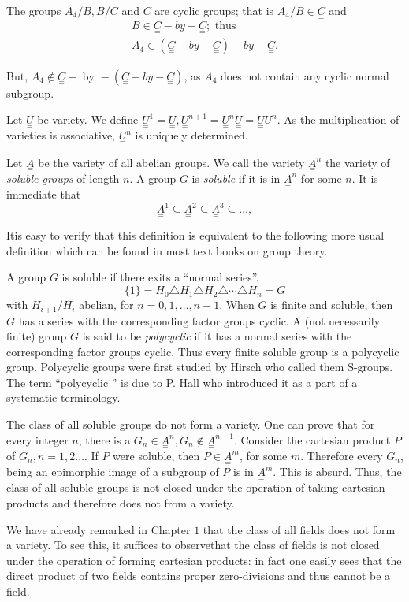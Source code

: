 The groups $A_4 /B, B/C$ and $C$ are cyclic groups; that is $A_4/B
\in \underset{=}{C}$ and 
\begin{gather*}
  B \in \underset{=}{C} - by -\underset{=}{C} ; \text{ thus}\\
  A_4 \in (\underset{=}{C} -by- \underset{=}{C}) -by - \underset{=}{C}.
\end{gather*}

But, $A_4 \notin \underset{=}{C} - \text{ by } - (\underset{=}{C} -by
-\underset{=}{C})$, as $A_4$ does not contain any cyclic normal
subgroup. 

Let $\underset{=}{U}$ be variety. We define $\underset{=}{U}^1 =
\underset{=}{U}, \underset{=}{U}^{n+1} = \underset{=}{U}^n
\underset{=}{U} = \underset{=}{U} U^n$. As the multiplication of
varieties is associative, $\underset{=}{U}^n$ is uniquely determined. 

Let $\underset{=}{A}$ be the variety of all abelian groups. We call
the variety $\underset{=}{A}^n$ the variety of \textit{soluble groups}
of length $n$. A group $G$ is \textit{soluble} if it is in
$\underset{=}{A}^n$ for some $n$. It is immediate that 
$$
\underset{=}{A}^1 \subseteq \underset{=}{A}^2 \subseteq
\underset{=}{A}^3 \subseteq \ldots, 
$$

It\pageoriginale is easy to verify that this definition is equivalent to the
following more usual definition which can be found in most text books
on group theory. 

A group $G$ is soluble if there exits a ``normal series''. 
$$
\{1\} = H_0 \triangle H_1 \triangle H_2 \triangle \cdots \triangle H_n = G
$$
with $H_{i+1}/ H_i$ abelian, for $n=0, 1,\ldots, n-1$. When $G$ is
finite and soluble, then $G$ has a series with the corresponding
factor groups cyclic. A (not necessarily finite) group $G$ is said to
be \textit{polycyclic} if it has a normal series with the
corresponding factor groups cyclic. Thus every finite soluble group is
a polycyclic group. Polycyclic groups were first studied by Hirsch who
called them S-groups. The term ``polycyclic '' is due to P. Hall who
introduced it as a part of a systematic terminology.  

The class of all soluble groups do not form a variety. One can prove
that for every integer $n$, there is a $G_n \in
\underset{=}{A}^n, G_n  \notin
\underset{=}{A}^{n-1}$. Consider the cartesian product $P$ of $G_n,
n=1,2 \ldots$. If $P$ were soluble, then $P \in
\underset{=}{A}^m$, for some $m$. Therefore every $G_n$, being an
epimorphic image of a subgroup of $P$ is in $\underset{=}{A}^m$. This
is absurd. Thus, the class of all soluble groups is not closed under
the operation of taking cartesian products and therefore does not from
a variety. 

We have already remarked in Chapter $1$ that the class of all fields
does not form a variety. To see this, it suffices to observe\pageoriginale that the
class of fields is not closed under the operation of forming cartesian
products: in fact one easily sees that the direct product of two
fields contains proper zero-divisions and thus cannot be a field.   


